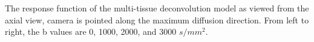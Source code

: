 \label{fig:responseZView} The response function of the multi-tissue deconvolution model as viewed from the axial view, camera is pointed along the maximum diffusion direction. From left to right, the b values are 0, 1000, 2000, and 3000 $s/mm^2$.